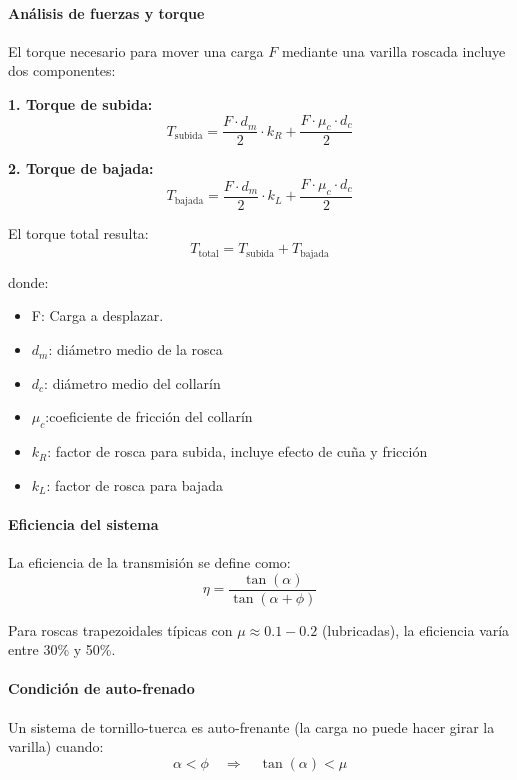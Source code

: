 \paragraph{Análisis de fuerzas y torque}
El torque necesario para mover una carga $F$ mediante una varilla roscada incluye dos componentes:

\textbf{1. Torque de subida:}
\begin{equation}
T_{\text{subida}} = \frac{F \cdot d_m}{2} \cdot k_R + \frac{F \cdot \mu_c \cdot d_c}{2}
\label{eq:torque_subida}
\end{equation}

\textbf{2. Torque de bajada:}
\begin{equation}
T_{\text{bajada}} = \frac{F \cdot d_m}{2} \cdot k_L + \frac{F \cdot \mu_c \cdot d_c}{2}
\label{eq:torque_bajada}
\end{equation}

El torque total resulta:
\begin{equation}
    T_{\text{total}} = T_{\text{subida}} + T_{\text{bajada}} 
    \label{eq:torque_total_varilla}
\end{equation}

donde:
\begin{itemize}
    \item F: Carga a desplazar.
    \item $d_m$: diámetro medio de la rosca
    \item $d_c$: diámetro medio del collarín
    \item $\mu_c$:coeficiente de fricción del collarín
    \item $k_R$:  factor de rosca para subida, incluye efecto de cuña y fricción
    \item $k_L$: factor de rosca para bajada
\end{itemize}

\paragraph{Eficiencia del sistema}
La eficiencia de la transmisión se define como:
\begin{equation}
    \eta = \frac{\tan(\alpha)}{\tan(\alpha + \phi)}
\end{equation}

Para roscas trapezoidales típicas con $\mu \approx 0.1-0.2$ (lubricadas), la eficiencia varía entre 30\% y 50\%.

\paragraph{Condición de auto-frenado}
Un sistema de tornillo-tuerca es auto-frenante (la carga no puede hacer girar la varilla) cuando:
\begin{equation}
    \alpha < \phi \quad \Rightarrow \quad \tan(\alpha) < \mu
\end{equation}

